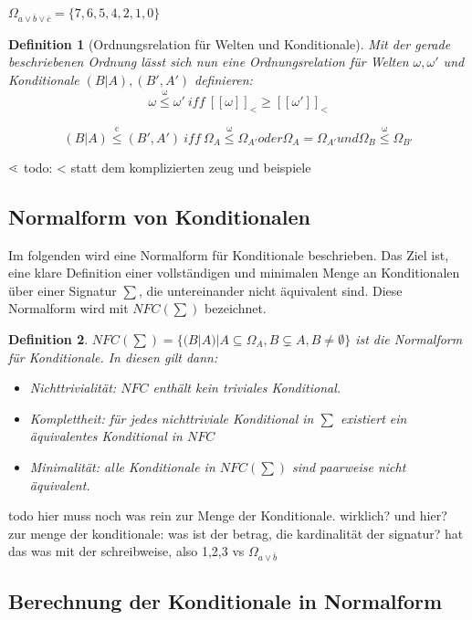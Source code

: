 \documentclass[12pt,a4paper]{article}
\newtheorem{theorem}{Definition}
\newcommand\dotl{\mathrel{%
    \mathchoice{\QEQ}{\QEQ}{\scriptsize\QEQ}{\tiny\QEQ}%
}}
\def\QEQ{{%
    \setbox0\hbox{<}%
    \rlap{\hbox to \wd0{\hss$\ \cdot$\hss}}\box0
}}
\begin{document}
$\Omega_{a\vee\overline{b}\vee \overline{c}} = \{ 7,6,5,4,2,1,0\}$
\begin{theorem}[Ordnungsrelation für Welten und Konditionale]
Mit der gerade beschriebenen Ordnung lässt sich nun eine Ordnungsrelation für Welten $\omega, \omega'$ und Konditionale $ (B|A), (B',A')$ definieren:
\begin{equation}
\omega \overset{\mathrm{\omega}}{\leq} \omega' \ iff \ [[\omega]]_< \geq [[\omega']]_<
\end{equation}

\begin{equation}
(B|A) \overset{\mathrm{c}}{\leq} (B',A') \ iff \ \Omega_A \overset{\mathrm{\omega}}{\leq} \Omega_{A'} oder \Omega_A =  \Omega_{A'} und \Omega_B \overset{\mathrm{\omega}}{\leq} \Omega_{B'}
\end{equation}

\end{theorem}
$ \dotl $
todo: < statt dem komplizierten zeug und beispiele
\subsection{Normalform von Konditionalen}
Im folgenden wird eine Normalform für Konditionale beschrieben. Das Ziel ist, eine klare Definition einer vollständigen und minimalen  Menge an Konditionalen über einer Signatur $\sum$, die untereinander nicht äquivalent sind. Diese Normalform wird mit $NFC(\sum)$ bezeichnet.
\begin{theorem}
$NFC(\sum) = \{(B|A)|A \subseteq
 \Omega_A, B \subsetneq A, B \neq \emptyset \}$ ist die Normalform für Konditionale. In diesen gilt dann:
 \begin{itemize}
\item{Nichttrivialität: $NFC$ enthält kein triviales Konditional.}
\item{Komplettheit: für jedes nichttriviale Konditional in $\sum$ existiert ein äquivalentes Konditional in $NFC$ }
\item{Minimalität: alle Konditionale in $NFC(\sum)$ sind paarweise nicht äquivalent.}
  \end{itemize}

\end{theorem}
 todo hier muss noch was rein zur Menge der Konditionale. wirklich? und hier? \\
 zur menge der konditionale: was ist der betrag, die kardinalität der signatur? hat das was mit der schreibweise, also {1,2,3} vs $\Omega_{a\vee \overline{b}}$
\subsection{Berechnung der Konditionale in Normalform}
\end{document}
